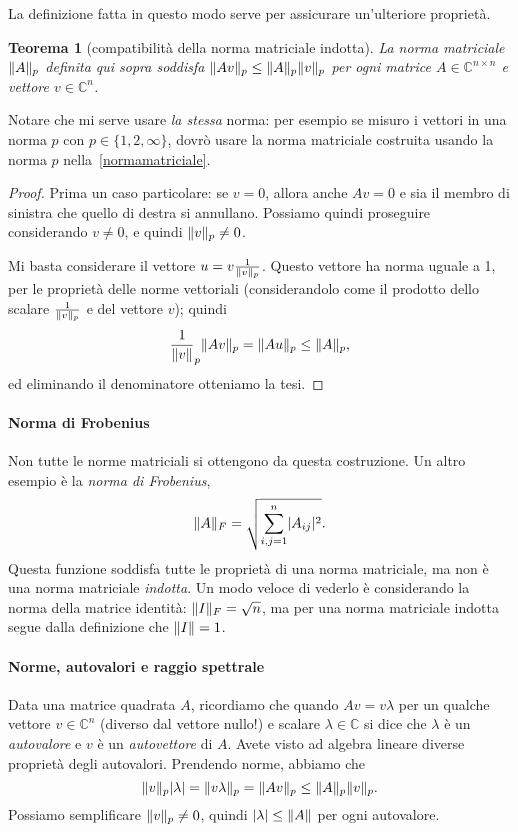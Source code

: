 \documentclass[a4paper]{report}
\DeclarePairedDelimiter{\abs}{\lvert}{\rvert}
\DeclarePairedDelimiter{\norm}{\lVert}{\rVert}
\newtheorem{theorem}{Teorema}[chapter]
\theoremstyle{definiton}
\theoremstyle{remark}
\begin{document}
La definizione fatta in questo modo serve per assicurare un'ulteriore proprietà.
\begin{theorem}[compatibilità della norma matriciale indotta] \label{thm:compatibilita}
La norma matriciale $\norm{A}_p$ definita qui sopra soddisfa $\norm{Av}_p \leq \norm{A}_p\norm{v}_p$ per ogni matrice $A\in\mathbb{C}^{n\times n}$ e vettore $v\in\mathbb{C}^n$.
\end{theorem}
Notare che mi serve usare \emph{la stessa} norma: per esempio se misuro i vettori in una norma $p$ con $p\in\{1,2,\infty\}$, dovrò usare la norma matriciale costruita usando la norma $p$ nella~\eqref{normamatriciale}.
\begin{proof}
Prima un caso particolare: se $v=0$, allora anche $Av=0$ e sia il membro di sinistra che quello di destra si annullano. Possiamo quindi proseguire considerando $v\neq 0$, e quindi $\norm{v}_p \neq 0$.

Mi basta considerare il vettore $u = v \frac{1}{\norm{v}_p}$. Questo vettore ha norma uguale a 1, per le proprietà delle norme vettoriali (considerandolo come il prodotto dello scalare $\frac{1}{\norm{v}_p}$ e del vettore $v$); quindi
\[
\frac{1}{\norm{v}}_p \norm{Av}_p  = \norm{Au}_p \leq \norm{A}_p,
\]
ed eliminando il denominatore otteniamo la tesi.
\end{proof}

\paragraph{Norma di Frobenius}

Non tutte le norme matriciali si ottengono da questa costruzione. Un altro esempio è la \emph{norma di Frobenius},
\[
\norm{A}_F = \sqrt{\sum_{i,j=1}^n \abs{A_{ij}}^2}.
\]
Questa funzione soddisfa tutte le proprietà di una norma matriciale, ma non è una norma matriciale \emph{indotta}. Un modo veloce di vederlo è considerando la norma della matrice identità: $\norm{I}_F = \sqrt{n}$, ma per una norma matriciale indotta segue dalla definizione che $\norm{I} = 1$.

\paragraph{Norme, autovalori e raggio spettrale}

Data una matrice quadrata $A$, ricordiamo che quando $Av = v\lambda$ per un qualche vettore $v\in\mathbb{C}^n$ (diverso dal vettore nullo!) e scalare $\lambda \in \mathbb{C}$ si dice che $\lambda$ è un \emph{autovalore} e $v$ è un \emph{autovettore} di $A$. Avete visto ad algebra lineare diverse proprietà degli autovalori. Prendendo norme, abbiamo che
\[
\norm{v}_p \abs{\lambda} = \norm{v\lambda}_p = \norm{Av}_p \leq \norm{A}_p \norm{v}_p.
\]
Possiamo semplificare $\norm{v}_p \neq 0$, quindi $\abs{\lambda} \leq \norm{A}$ per ogni autovalore.
\end{document}
